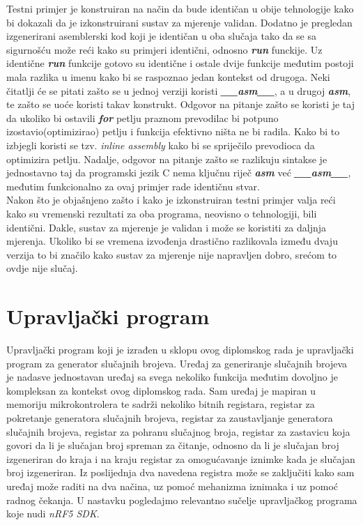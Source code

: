 Testni primjer je konstruiran na način da bude identičan u obije tehnologije kako bi dokazali da je izkonstruirani sustav za mjerenje validan. Dodatno je pregledan izgenerirani asemblerski kod koji je identičan u oba slučaja tako da se sa sigurnošću može reći kako su primjeri identični, odnosno \textbf{\textit{run}} funckije. Uz identične \textbf{\textit{run}} funkcije gotovo su identične i ostale dvije funkcije međutim postoji mala razlika u imenu kako bi se raspoznao jedan kontekst od drugoga. Neki čitatlji će se pitati zašto se u jednoj verziji koristi \textbf{\textit{\_\_asm\_\_}}, a u drugoj \textbf{\textit{asm}}, te zašto se uoće koristi takav konstrukt. Odgovor na pitanje zašto se koristi je taj da ukoliko bi ostavili \textbf{\textit{for}} petlju praznom prevodilac bi potpuno izostavio(optimizirao) petlju i funkcija efektivno ništa ne bi radila. Kako bi to izbjegli koristi se tzv. \textit{inline assembly} kako bi se spriječilo prevodioca da optimizira petlju. Nadalje, odgovor na pitanje zašto se razlikuju sintakse je jednostavno taj da programski jezik C nema ključnu riječ \textbf{\textit{asm}} već \textbf{\textit{\_\_asm\_\_}}, međutim funkcionalno za ovaj primjer rade identičnu stvar.\\
Nakon što je objašnjeno zašto i kako je izkonstruiran testni primjer valja reći kako su vremenski rezultati za oba programa, neovisno o tehnologiji, bili identični. Dakle, sustav za mjerenje je validan i može se koristiti za daljnja mjerenja. Ukoliko bi se vremena izvođenja drastično razlikovala između dvaju verzija to bi značilo kako sustav za mjerenje nije napravljen dobro, srećom to ovdje nije slučaj. 

\section{Upravljački program}
Upravljački program koji je izrađen u sklopu ovog diplomskog rada je upravljački program za generator slučajnih brojeva. Uređaj za generiranje slučajnih brojeva je nadasve jednostavan uređaj sa svega nekoliko funkcija međutim dovoljno je kompleksan za kontekst ovog diplomskog rada. Sam uređaj je mapiran u memoriju mikrokontrolera te sadrži nekoliko bitnih registara, registar za pokretanje generatora slučajnih brojeva, registar za zaustavljanje generatora slučajnih brojeva, registar za pohranu slučajnog broja, registar za zastavicu koja govori da li je slučajan broj spreman za čitanje, odnosno da li je slučajan broj izgeneriran do kraja i na kraju registar za omogućavanje iznimke kada je slučajan broj izgeneriran. Iz poslijednja dva navedena registra može se zaključiti kako sam uređaj može raditi na dva načina, uz pomoć mehanizma iznimaka i uz pomoć radnog čekanja. U nastavku pogledajmo relevantno sučelje upravljačkog programa koje nudi \textit{nRF5 SDK}. 

